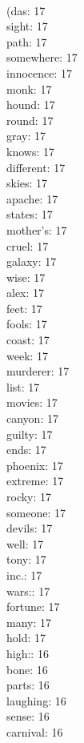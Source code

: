 \begin{multicols}{6}
  \\ (das: 17
  \\ sight: 17
  \\ path: 17
  \\ somewhere: 17
  \\ innocence: 17
  \\ monk: 17
  \\ hound: 17
  \\ round: 17
  \\ gray: 17
  \\ knows: 17
  \\ different: 17
  \\ skies: 17
  \\ apache: 17
  \\ states: 17
  \\ mother's: 17
  \\ cruel: 17
  \\ galaxy: 17
  \\ wise: 17
  \\ alex: 17
  \\ feet: 17
  \\ fools: 17
  \\ coast: 17
  \\ week: 17
  \\ murderer: 17
  \\ list: 17
  \\ movies: 17
  \\ canyon: 17
  \\ guilty: 17
  \\ ends: 17
  \\ phoenix: 17
  \\ extreme: 17
  \\ rocky: 17
  \\ someone: 17
  \\ devils: 17
  \\ well: 17
  \\ tony: 17
  \\ inc.: 17
  \\ wars:: 17
  \\ fortune: 17
  \\ many: 17
  \\ hold: 17
  \\ high:: 16
  \\ bone: 16
  \\ parts: 16
  \\ laughing: 16
  \\ sense: 16
  \\ carnival: 16

\end{multicols}
